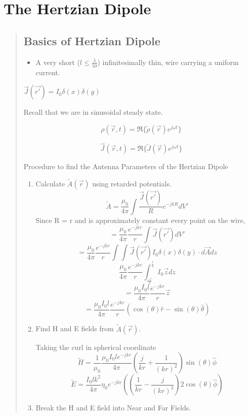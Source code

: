 \documentclass{article} %
\begin{document}
\section{The Hertzian Dipole}
\begin{quote}
    \subsection{Basics of Hertzian Dipole}
    \begin{itemize}
        \item A very short ($l \leq \frac{\lambda}{50}$) infinitesimally thin, wire carrying a uniform current.
    \end{itemize}

    $\vec{J}(\vec{r'}) = I_0 \delta(x)\delta(y)$

    Recall that we are in sinusoidal steady state.

    \[\rho(\vec{r}, t) = \Re \{\tilde{\rho}(\vec{r})e^{j \omega t}\}\]

    \[\vec{J}(\vec{r}, t) = \Re \{\tilde{J}(\vec{r})e^{j \omega t}\}\]

    Procedure to find the Antenna Parameters of the Hertzian Dipole
    \begin{enumerate}
        \item Calculate $\tilde{A}(\vec{r})$ using retarded potentials.
              \[\tilde{A} = \frac{\mu_0}{4 \pi}\int \frac{\vec{J}(\vec{r'})}{R}e^{-jkR}dV'\]
              Since R = r and is approximately constant every point on the wire,
              \[= \frac{\mu_0}{4 \pi}\frac{e^{-jkr}}{r} \int \vec{J}(\vec{r'})dV'\]
              \[= \frac{\mu_0}{4 \pi}\frac{e^{-jkr}}{r}\int \int \vec{J}(\vec{r'})  I_0 \delta(x)\delta(y) \cdot d\vec{A} dz\]
              \[\frac{\mu_0}{4 \pi}\frac{e^{-jkr}}{r}\int_{\frac{-l}{2}}^{\frac{l}{2}}I_0 \vec{z} dz\]
              \[= \frac{\mu_0 I_0 l}{4 \pi}\frac{e^{-jkr}}{r}\vec{z}\]
              \[= \frac{\mu_0 I_0 l}{4 \pi}\frac{e^{-jkr}}{r}(\cos(\theta) \hat{r} -\sin(\theta) \hat{\theta})\]
        \item Find H and E fields from $\tilde{A}(\vec{r})$.

              \bigskip
              Taking the curl in spherical coordinate
              \[\tilde{H} = \frac{1}{\mu_0}\frac{\mu_0 I_0 l e^{-jkr}}{4 \pi}\left(\frac{j}{kr} + \frac{1}{(kr)^2}\right)\sin(\theta)\hat{\phi}\]
              \[\tilde{E}= \frac{I_0 l k^2}{4 \pi}\eta_0 e^{-jkr}(\left(\frac{1}{kr} - \frac{j}{(kr)^3}\right)2\cos(\theta)\hat{\phi}) \]
        \item Break the H and E field into Near and Far Fields.


\end{enumerate}
\end{quote}
\end{document}
